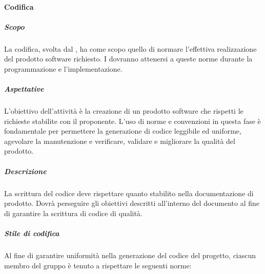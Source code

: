 			\paragraph{Codifica}	
				\subparagraph{Scopo}
				La codifica, svolta dal , ha come scopo quello di normare l'effettiva realizzazione del prodotto software richiesto. I  dovranno attenersi a queste norme durante la programmazione e l'implementazione.
				\subparagraph{Aspettative}
				L'obiettivo dell'attività è la creazione di un prodotto software che rispetti le richieste stabilite con il proponente. L'uso di norme e convenzioni in questa fase è fondamentale per permettere la generazione di codice leggibile ed uniforme, agevolare la manutenzione e verificare, validare e migliorare la qualità del prodotto.
				\subparagraph{Descrizione}
				La scrittura del codice deve rispettare quanto stabilito nella documentazione di prodotto. Dovrà perseguire gli obiettivi descritti all'interno del documento  al fine di garantire la scrittura di codice di qualità.
				\subparagraph{Stile di codifica}
				Al fine di garantire uniformità nella generazione del codice del progetto, ciascun membro del gruppo è tenuto a rispettare le seguenti norme:
